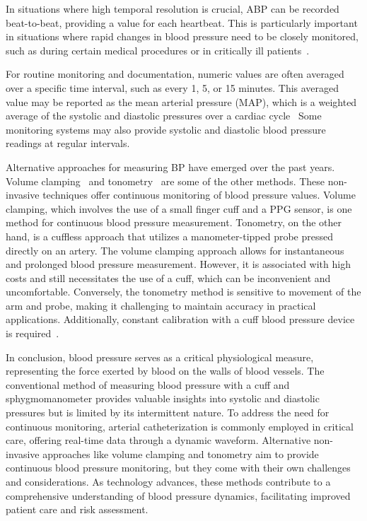 In situations where high temporal resolution is crucial, ABP can be recorded beat-to-beat, providing a value for each heartbeat.
This is particularly important in situations where rapid changes in blood pressure need to be closely monitored, such as during certain medical procedures or in critically ill patients~\cite{lehmanMethodsBloodPressure2013}.

For routine monitoring and documentation, numeric values are often averaged over a specific time interval, such as every 1, 5, or 15 minutes.
This averaged value may be reported as the mean arterial pressure (MAP), which is a weighted average of the systolic and diastolic pressures over a cardiac cycle~\cite{demersPhysiologyMeanArterial2024}
Some monitoring systems may also provide systolic and diastolic blood pressure readings at regular intervals.

Alternative approaches for measuring BP have emerged over the past years.
Volume clamping~\cite{kimBallistocardiogramBasedApproachCuffless2018} and tonometry~\cite{imholzFifteenYearsExperience1998} are some of the other methods.
These non-invasive techniques offer continuous monitoring of blood pressure values.
Volume clamping, which involves the use of a small finger cuff and a PPG sensor, is one method for continuous blood pressure measurement.
Tonometry, on the other hand, is a cuffless approach that utilizes a manometer-tipped probe pressed directly on an artery.
The volume clamping approach allows for instantaneous and prolonged blood pressure measurement.
However, it is associated with high costs and still necessitates the use of a cuff, which can be inconvenient and uncomfortable.
Conversely, the tonometry method is sensitive to movement of the arm and probe, making it challenging to maintain accuracy in practical applications.
Additionally, constant calibration with a cuff blood pressure device is required~\cite{peterReviewMethodsNoninvasive2014}.

\vspace{0.2cm}

In conclusion, blood pressure serves as a critical physiological measure, representing the force exerted by blood on the walls of blood vessels.
The conventional method of measuring blood pressure with a cuff and sphygmomanometer provides valuable insights into systolic and diastolic pressures but is limited by its intermittent nature.
To address the need for continuous monitoring, arterial catheterization is commonly employed in critical care, offering real-time data through a dynamic waveform.
Alternative non-invasive approaches like volume clamping and tonometry aim to provide continuous blood pressure monitoring, but they come with their own challenges and considerations.
As technology advances, these methods contribute to a comprehensive understanding of blood pressure dynamics, facilitating improved patient care and risk assessment.

